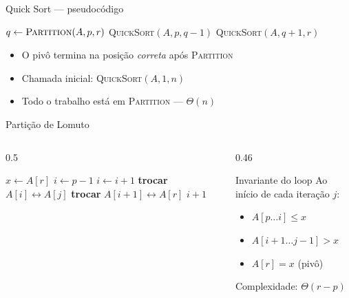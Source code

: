 \documentclass[aspectratio=169]{beamer}
\begin{document}
\begin{frame}[fragile]{Quick Sort — pseudocódigo}
  \begin{algorithm}[H]
    \caption{\textsc{QuickSort}$(A, p, r)$}
    \begin{algorithmic}[1]
        \State $q \gets \textsc{Partition}(A, p, r)$
        \State \textsc{QuickSort}$(A, p, q - 1)$
        \State \textsc{QuickSort}$(A, q + 1, r)$
      \EndIf
    \end{algorithmic}
  \end{algorithm}

  \vspace{8pt}
  \begin{itemize}
    \item O pivô termina na posição \emph{correta} após \textsc{Partition}
    \item Chamada inicial: \textsc{QuickSort}$(A, 1, n)$
    \item Todo o trabalho está em \textsc{Partition} — $\Theta(n)$
  \end{itemize}
\end{frame}

\begin{frame}[fragile]{Partição de Lomuto}
  \begin{columns}[T]
    \begin{column}{0.5\textwidth}
      \begin{algorithm}[H]
        \caption{\textsc{Partition}$(A, p, r)$}
        \begin{algorithmic}[1]
          \State $x \gets A[r]$ 
          \State $i \gets p - 1$
              \State $i \gets i + 1$
              \State \textbf{trocar} $A[i] \leftrightarrow A[j]$
            \EndIf
          \EndFor
          \State \textbf{trocar} $A[i{+}1] \leftrightarrow A[r]$
          \State \Return $i + 1$
        \end{algorithmic}
      \end{algorithm}
    \end{column}
    \begin{column}{0.46\textwidth}
      \begin{block}{Invariante do loop}
        Ao início de cada iteração $j$:
        \begin{itemize}
          \item $A[p \ldots i] \leq x$
          \item $A[i{+}1 \ldots j{-}1] > x$
          \item $A[r] = x$ (pivô)
        \end{itemize}
      \end{block}
      \vspace{4pt}
      Complexidade: $\Theta(r - p)$
    \end{column}
  \end{columns}
\end{frame}
\end{document}

